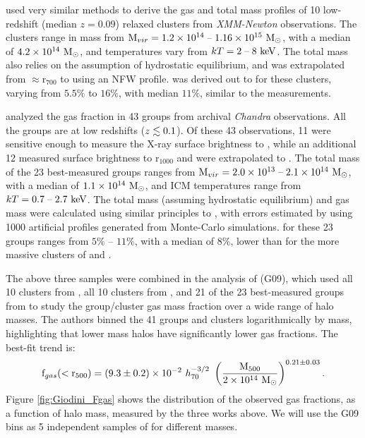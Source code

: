 \textbf{\citet{Arnaud2007}} used very similar methods to derive the
gas and total mass profiles of 10 low-redshift (median $z = 0.09$)
relaxed clusters from \textit{XMM-Newton} observations. The clusters
range in mass from $\textrm{M\ensuremath{_{vir}}} = 1.2\times 10^{14}\;\textrm{--}\;1.16 \times 10^{15}~\textrm{M}_\odot$,
with a median of $4.2 \times 10^{14}~\textrm{M}_\odot$, and temperatures vary from
$kT = 2\;\textrm{--}\;8~\textrm{keV}$. The total mass also relies on the
assumption of hydrostatic equilibrium, and was extrapolated from
$\approx$r$_{700}$ to \rfive{} using an NFW profile.  \fg{} was derived
out to \rfive{} for these clusters, varying from $5.5\%$ to $16\%$,
with median $11\%$, similar to the \citet{Vikhlinin2006} measurements.

\textbf{\citet{Sun2009}} analyzed the gas fraction in 43 groups from
archival \textit{Chandra} observations. All the groups are at low
redshifts ($z \lesssim 0.1$). Of these 43 observations, 11 were sensitive
enough to measure the X-ray surface brightness to \rfive{}, while an
additional 12 measured surface brightness to r$_{1000}$ and were
extrapolated to \rfive{}. The total mass of the 23 best-measured
groups ranges from $\textrm{M\ensuremath{_{vir}}} = 2.0\times 10^{13}\;\textrm{--}\;2.1 \times 10^{14}~\textrm{M}_\odot$, with a
median of $1.1 \times 10^{14}~\textrm{M}_\odot$, and ICM temperatures range from
$kT = 0.7\;\textrm{--}\;2.7~\textrm{keV}$. The total mass (assuming hydrostatic
equilibrium) and gas mass were calculated using similar principles to
\citet{Vikhlinin2006}, with errors estimated by using 1000 artificial
profiles generated from Monte-Carlo simulations. \fgfive{} for
these 23 groups ranges from $5\%$ -- $11\%$, with a median of $8\%$,
lower than for the more massive clusters of \citet{Vikhlinin2006} and
\citet{Arnaud2007}.



The above three samples were combined in the analysis of
\textbf{\citet{Giodini2009}} (G09), which used all 10 clusters from
\citet{Vikhlinin2006}, all 10 clusters from \citet{Arnaud2007}, and 21
of the 23 best-measured groups from \citet{Sun2009} to study the
group/cluster gas mass fraction over a wide range of halo masses. The
authors binned the 41 groups and clusters logarithmically by mass,
highlighting that lower mass halos have significantly lower gas
fractions. The best-fit trend is:
\begin{equation}
\textrm{f\ensuremath{_{gas}}}(<\textrm{r\ensuremath{_{500}}}) = (9.3 \pm 0.2)\times 10^{-2}~h_{70}^{-3/2}~
\left(\frac{\textrm{M\ensuremath{_{500}}}}{2\times 10^{14}~\textrm{M}_\odot}\right)^{0.21 \pm 0.03}.
\end{equation}
Figure \ref{fig:Giodini_Fgas} shows the distribution of the observed
gas fractions, as a function of halo mass, measured by the three works
above. We will use the G09 bins as 5 independent samples of \fg{} for
different masses. 

